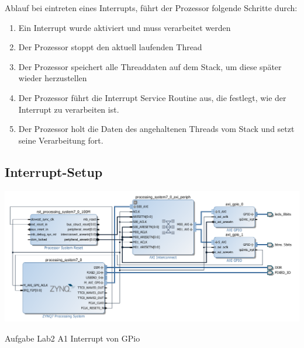Ablauf bei eintreten eines Interrupts, führt der Prozessor folgende Schritte durch: 
\begin{enumerate}
  \item Ein Interrupt wurde aktiviert und muss verarbeitet werden
  \item Der Prozessor stoppt den aktuell laufenden Thread
  \item Der Prozessor speichert alle Threaddaten auf dem Stack, um diese später wieder herzustellen
  \item Der Prozessor führt die Interrupt Service Routine aus, die festlegt, wie der Interrupt zu verarbeiten ist.
  \item Der Prozessor holt die Daten des angehaltenen Threads vom Stack und setzt seine Verarbeitung fort.
\end{enumerate}

 \subsection{Interrupt-Setup}
 
 \begin{minipage}{\textwidth}
    \begin{center}        
        \includegraphics[scale=0.58]{img/lab2a1.png} 
    \end{center}
\end{minipage}
\begin{center}
Aufgabe Lab2 A1 Interrupt von GPio
\end{center}
 
